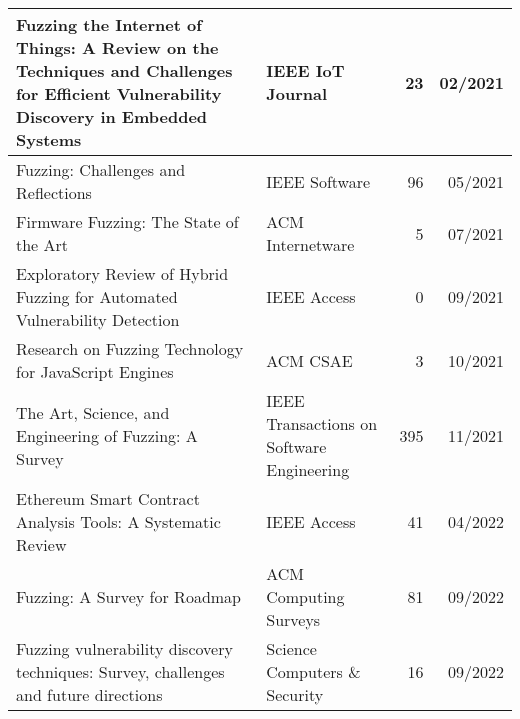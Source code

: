\documentclass{article}
\begin{document}
\begin{longtable}{|P{0.44\textwidth}|P{0.32\textwidth}|r|r|}
  Fuzzing the Internet of Things: A Review on the Techniques and Challenges for Efficient Vulnerability Discovery in Embedded Systems\cite{IoT}      & IEEE IoT Journal                                           & 23             & 02/2021       \\\hline
  Fuzzing: Challenges and Reflections\cite{ChallengesAndReflections}                                                                                 & IEEE Software                                              & 96             & 05/2021       \\\hline
  Firmware Fuzzing: The State of the Art\cite{Firmware}                                                                                              & ACM Internetware                                           & 5              & 07/2021       \\\hline
  Exploratory Review of Hybrid Fuzzing for Automated Vulnerability Detection                                                                         & IEEE Access                                                & 0              & 09/2021       \\\hline
  Research on Fuzzing Technology for JavaScript Engines\cite{JavaScript}                                                                             & ACM CSAE                                                   & 3              & 10/2021       \\\hline
  The Art, Science, and Engineering of Fuzzing: A Survey\cite{ArtScienceEng}                                                                         & IEEE Transactions on Software Engineering                  & 395            & 11/2021       \\\hline
  Ethereum Smart Contract Analysis Tools: A Systematic Review\cite{Ethereum}                                                                         & IEEE Access                                                & 41             & 04/2022       \\\hline
  Fuzzing: A Survey for Roadmap\cite{FuzzingASurveyforRoadmap}                                                                                       & ACM Computing Surveys                                      & 81             & 09/2022       \\\hline
  Fuzzing vulnerability discovery techniques: Survey, challenges and future directions\cite{FuzzingVulnerabilityDiscoveryTechniques}                 & Science Computers \& Security                              & 16             & 09/2022       \\\hline

\end{longtable}
\end{document}
